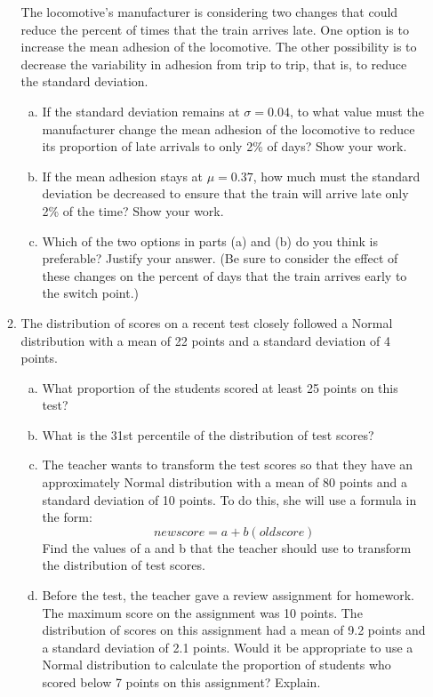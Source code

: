 \documentclass[a4paper,12pt,twoside]{book}
\begin{document}
\begin{itemize}
\begin{enumerate}
       The locomotive’s manufacturer is considering two changes that could reduce the percent of times that the train arrives late. One option is to increase the mean adhesion of the locomotive. The other possibility is to decrease the variability in adhesion from trip to trip, that is, to reduce the standard deviation. 
       
       \begin{enumerate}[(a), resume]
       \item  If the standard deviation remains at $\sigma = 0.04$, to what value must the manufacturer change the mean adhesion of the locomotive to reduce its proportion of late arrivals to only 2\% of days? Show your work.
       \item  If the mean adhesion stays at $\mu = 0.37$, how much must the standard deviation be decreased to ensure that the train will arrive late only 2\% of the time? Show your work.
       \item Which of the two options in parts (a) and (b) do you think is preferable? Justify your answer. (Be sure to consider the effect of these changes on the percent of days that the train arrives early to the switch point.)
       \end{enumerate}
       \newpage
 
 \item The distribution of scores on a recent test closely followed a Normal distribution with a mean of 22 points and a standard deviation of 4 points. 
 
    \begin{enumerate}[(a)]
        \item What proportion of the students scored at least 25 points on this test?
        \item What is the 31st percentile of the distribution of test scores?
        \item The teacher wants to transform the test scores so that they have an approximately Normal distribution with a mean of 80 points and a standard deviation of 10 points. To do this, she will use a formula in the form:
        $$new score = a + b (old score)$$
Find the values of a and b that the teacher should use to transform the distribution of test scores.
        \item Before the test, the teacher gave a review assignment for homework. The maximum score on the assignment was 10 points. The distribution of scores on this assignment had a mean of 9.2 points and a standard deviation of 2.1 points. Would it be appropriate to use a Normal distribution to calculate the proportion of students who scored below 7 points on this assignment? Explain.
    \end{enumerate}
    \newpage
    

\end{enumerate}
\end{itemize}
\end{document}
